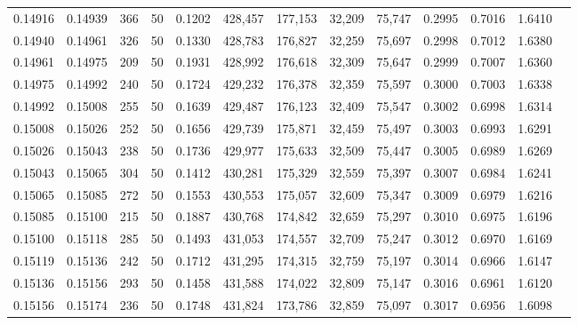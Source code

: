 \begin{tabular}{rrrrrrrrrrrrr}
0.14916 & 0.14939 &   366 &  50 &                                     0.1202 & 428,457 & 177,153 &  32,209 &  75,747 & 0.2995 & 0.7016 & 1.6410 \\
0.14940 & 0.14961 &   326 &  50 &                                     0.1330 & 428,783 & 176,827 &  32,259 &  75,697 & 0.2998 & 0.7012 & 1.6380 \\
0.14961 & 0.14975 &   209 &  50 &                                     0.1931 & 428,992 & 176,618 &  32,309 &  75,647 & 0.2999 & 0.7007 & 1.6360 \\
0.14975 & 0.14992 &   240 &  50 &                                     0.1724 & 429,232 & 176,378 &  32,359 &  75,597 & 0.3000 & 0.7003 & 1.6338 \\
0.14992 & 0.15008 &   255 &  50 &                                     0.1639 & 429,487 & 176,123 &  32,409 &  75,547 & 0.3002 & 0.6998 & 1.6314 \\
0.15008 & 0.15026 &   252 &  50 &                                     0.1656 & 429,739 & 175,871 &  32,459 &  75,497 & 0.3003 & 0.6993 & 1.6291 \\
0.15026 & 0.15043 &   238 &  50 &                                     0.1736 & 429,977 & 175,633 &  32,509 &  75,447 & 0.3005 & 0.6989 & 1.6269 \\
0.15043 & 0.15065 &   304 &  50 &                                     0.1412 & 430,281 & 175,329 &  32,559 &  75,397 & 0.3007 & 0.6984 & 1.6241 \\
0.15065 & 0.15085 &   272 &  50 &                                     0.1553 & 430,553 & 175,057 &  32,609 &  75,347 & 0.3009 & 0.6979 & 1.6216 \\
0.15085 & 0.15100 &   215 &  50 &                                     0.1887 & 430,768 & 174,842 &  32,659 &  75,297 & 0.3010 & 0.6975 & 1.6196 \\
0.15100 & 0.15118 &   285 &  50 &                                     0.1493 & 431,053 & 174,557 &  32,709 &  75,247 & 0.3012 & 0.6970 & 1.6169 \\
0.15119 & 0.15136 &   242 &  50 &                                     0.1712 & 431,295 & 174,315 &  32,759 &  75,197 & 0.3014 & 0.6966 & 1.6147 \\
0.15136 & 0.15156 &   293 &  50 &                                     0.1458 & 431,588 & 174,022 &  32,809 &  75,147 & 0.3016 & 0.6961 & 1.6120 \\
0.15156 & 0.15174 &   236 &  50 &                                     0.1748 & 431,824 & 173,786 &  32,859 &  75,097 & 0.3017 & 0.6956 & 1.6098 \\

\end{tabular}
